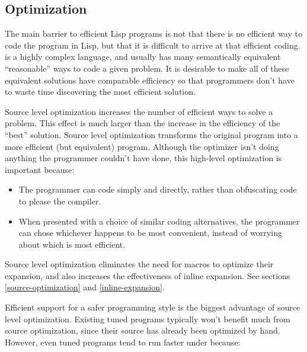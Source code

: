 \subsection{Optimization}

The main barrier to efficient Lisp programs is not that there is no
efficient way to code the program in Lisp, but that it is difficult to
arrive at that efficient coding.  \clisp{} is a highly complex
language, and usually has many semantically equivalent ``reasonable''
ways to code a given problem.  It is desirable to make all of these
equivalent solutions have comparable efficiency so that programmers
don't have to waste time discovering the most efficient solution.

Source level optimization increases the number of efficient ways to
solve a problem.  This effect is much larger than the increase in the
efficiency of the ``best'' solution.  Source level optimization
transforms the original program into a more efficient (but equivalent)
program.  Although the optimizer isn't doing anything the programmer
couldn't have done, this high-level optimization is important because:

\begin{itemize} 
\item The programmer can code simply and directly, rather than
  obfuscating code to please the compiler.
  
\item When presented with a choice of similar coding alternatives, the
  programmer can chose whichever happens to be most convenient,
  instead of worrying about which is most efficient.
\end{itemize}

Source level optimization eliminates the need for macros to optimize
their expansion, and also increases the effectiveness of inline
expansion.  See sections \ref{source-optimization} and
\ref{inline-expansion}.

Efficient support for a safer programming style is the biggest
advantage of source level optimization.  Existing tuned programs
typically won't benefit much from source optimization, since their
source has already been optimized by hand.  However, even tuned
programs tend to run faster under \python{} because:

